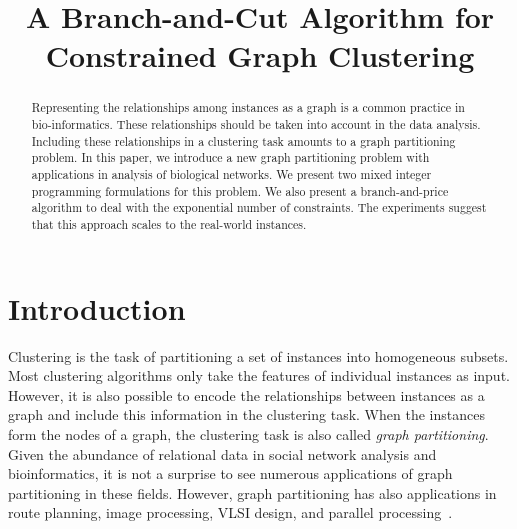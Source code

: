 \documentclass[conference,compsoc]{IEEEtran}
\begin{document}
\title{A Branch-and-Cut Algorithm for Constrained Graph Clustering}

\author{
\and
{}
\and
{}
}

\maketitle

\begin{abstract}
Representing the relationships among instances as a graph is a common practice in bio-informatics. These relationships should be taken into account in the data analysis. Including these relationships in a clustering task amounts to a graph partitioning problem. In this paper, we introduce a new graph partitioning problem with applications in analysis of biological networks. We present two mixed integer programming formulations for this problem. We also present a branch-and-price algorithm to deal with the exponential number of constraints. The experiments suggest that this approach scales to the real-world instances.
\end{abstract}

\section{Introduction}
\label{introduction}

Clustering is the task of partitioning a set of instances into
homogeneous subsets. Most clustering algorithms only take the features
of individual instances as input. However, it is also possible to
encode the relationships between instances as a graph and include this
information in the clustering task. When the instances form the nodes
of a graph, the clustering task is also called \emph{graph
  partitioning}. Given the abundance of relational data in social
network analysis and bioinformatics, it is not a surprise to see
numerous applications of graph partitioning in these fields. However,
graph partitioning has also applications in route planning, image
processing, VLSI design, and parallel processing~\cite{Survey}.
\end{document}
